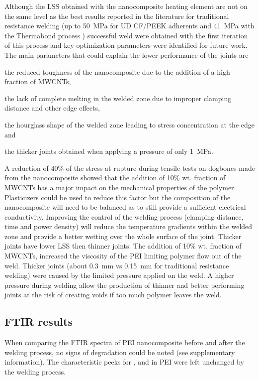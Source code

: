 \documentclass[11pt,review,times]{elsarticle}
\begin{document}
Although the LSS obtained with the nanocomposite heating element are not on the same level as the best results reported in the literature for traditional resistance welding (up to \SI{50}{\MPa} for UD CF/PEEK adherents \cite{Dube2015} and \SI{41}{\MPa} with the Thermabond process \cite{Smiley1991a}) successful weld were obtained with the first iteration of this process and key optimization parameters were identified for future work. 
The main parameters that could explain the lower performance of the joints are \begin{enumerate*}[label=(\arabic*)]
	\item the reduced toughness of the nanocomposite due to the addition of a high fraction of MWCNTs,
	\item the lack of complete melting in the welded zone due to improper clamping distance and other edge effects,
	\item the hourglass shape of the welded zone leading to stress concentration at the edge and
	\item the thicker joints obtained when applying a pressure of only \SI{1}{\MPa}. 
\end{enumerate*}
A reduction of 40\% of the stress at rupture during tensile tests on dogbones made from the nanocomposite showed that the addition of 10\% wt. fraction of MWCNTs has a major impact on the mechanical properties of the polymer. 
Plasticizers could be used to reduce this factor but the composition of the nanocomposite will need to be balanced as to still provide a sufficient electrical conductivity. 
Improving the control of the welding process (clamping distance, time and power density) will reduce the temperature gradients within the welded zone and provide a better wetting over the whole surface of the joint. 
Thicker joints have lower LSS then thinner joints. 
The addition of 10\% wt. fraction of MWCNTs, increased the viscosity of the PEI limiting polymer flow out of the weld. 
Thicker joints (about \SI{0.3}{\mm} vs \SI{0.15}{\mm} for traditional resistance welding) were caused by the limited pressure applied on the weld. 
A higher pressure during welding allow the production of thinner and better performing joints at the risk of creating voids if too much polymer leaves the weld. 

\subsection{FTIR results}

When comparing the FTIR spectra of PEI nanocomposite before and after the welding process, no signs of degradation could be noted (see supplementary information). 
The characteristic peeks for ,  and  in PEI were left unchanged by the welding process. 
\end{document}
